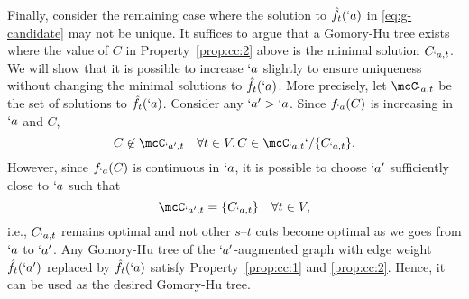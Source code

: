 \begin{Proof}
  Finally, consider the remaining case where the solution to $\hat{f}_t(`a)$ in \eqref{eq:g-candidate} may not be unique. It suffices to argue that a Gomory-Hu tree exists where the value of $C$ in Property~\ref{prop:cc:2} above is the minimal solution $C_{`a,t}$. We will show that it is possible to increase $`a$ slightly to ensure uniqueness without changing the minimal solutions to $\hat{f}_t(`a)$. More precisely, let $\mcC_{`a,t}$ be the set of solutions to $\hat{f}_t(`a)$. Consider any $`a'>`a$. Since $f_{`a}(C)$ is increasing in $`a$ and $C$,
  \[C\not\in \mcC_{`a',t}\quad \forall t\in V, C\in \mcC_{`a,t}`/\Set{C_{`a,t}}.\]
  However, since $f_{`a}(C)$ is continuous in $`a$, it is possible to choose $`a'$ sufficiently close to $`a$ such that
  \[ \mcC_{`a',t} = \Set{C_{`a,t}} \quad \forall t\in V,\] 
  i.e., $C_{`a,t}$ remains optimal and not other $s$--$t$ cuts become optimal as we goes from $`a$ to $`a'$. Any Gomory-Hu tree of the $`a'$-augmented graph with edge weight $\hat{f}_t(`a')$ replaced by $\hat{f}_t(`a)$ satisfy Property~\ref{prop:cc:1} and \ref{prop:cc:2}. Hence, it can be used as the desired Gomory-Hu tree.
\end{Proof}


